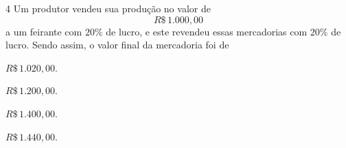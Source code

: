 

\num{4}  Um produtor vendeu sua produção no valor de $$R\$\,1.000,00$$ a um
feirante com $20\%$ de lucro, e este revendeu essas mercadorias com $20\%$
de lucro. Sendo assim, o valor final da mercadoria foi de

\begin{escolha}
\item $R\$\,1.020,00$.
\item $R\$\,1.200,00$.
\item $R\$\,1.400,00$.
\item $R\$\,1.440,00$.
\end{escolha}



